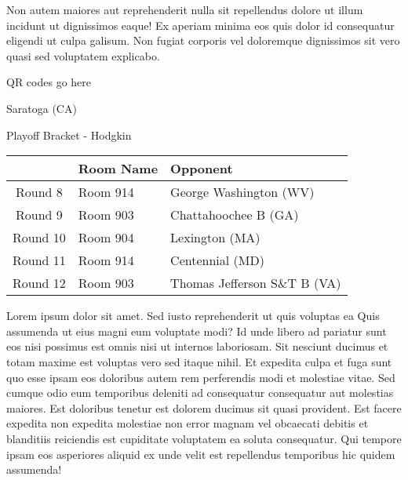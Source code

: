 \documentclass{article}%
\begin{document}
\newline%
Non autem maiores aut reprehenderit nulla sit repellendus dolore ut illum incidunt ut dignissimos eaque! Ex aperiam minima eos quis dolor id consequatur eligendi ut culpa galisum. Non fugiat corporis vel doloremque dignissimos sit vero quasi sed voluptatem explicabo.\newline%
\newline%
%
\vspace*{30pt}%
\begin{center}%
\begin{Huge}%
QR codes go here%
\end{Huge}%
\end{center}%
\newpage%
\begin{center}%
\begin{Huge}%
Saratoga (CA)%
\end{Huge}%
\vspace*{8pt}%
\linebreak%
\begin{Large}%
Playoff Bracket {-} Hodgkin%
\end{Large}%
\end{center}%
\begin{tabularx}{\textwidth}{|c|Y|Y|}%
\hline%
&Room Name&Opponent\\%
\hline%
Round 8&Room 914&George Washington (WV)\\%
Round 9&Room 903&Chattahoochee B (GA)\\%
Round 10&Room 904&Lexington (MA)\\%
Round 11&Room 914&Centennial (MD)\\%
Round 12&Room 903&Thomas Jefferson S\&T B (VA)\\%
\hline%
\end{tabularx}%
\vspace*{8pt}%
\linebreak%
\newline%
\newline%
Lorem ipsum dolor sit amet. Sed iusto reprehenderit ut quis voluptas ea Quis assumenda ut eius magni eum voluptate modi? Id unde libero ad pariatur sunt eos nisi possimus est omnis nisi ut internos laboriosam. Sit nesciunt ducimus et totam maxime est voluptas vero sed itaque nihil. Et expedita culpa et fuga sunt quo esse ipsam eos doloribus autem rem perferendis modi et molestiae vitae.\newline%
\newline%
Sed cumque odio eum temporibus deleniti ad consequatur consequatur aut molestias maiores. Est doloribus tenetur est dolorem ducimus sit quasi provident. Est facere expedita non expedita molestiae non error magnam vel obcaecati debitis et blanditiis reiciendis est cupiditate voluptatem ea soluta consequatur. Qui tempore ipsam eos asperiores aliquid ex unde velit est repellendus temporibus hic quidem assumenda!\newline%
\end{document}
